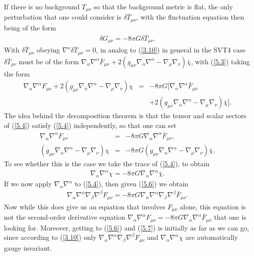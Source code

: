 If there is no background $T_{\mu\nu}$ so that the background metric is flat, the only perturbation that one could consider is $\delta \bar{T}_{\mu\nu}$, with the fluctuation equation then being of the form 
%
\begin{eqnarray}
\delta G_{\mu\nu}=-8 \pi G \delta \bar{T}_{\mu\nu}. 
\label{5.3}
\end{eqnarray}
%
With  $\delta \bar{T}_{\mu\nu}$ obeying $\nabla^{\nu}\delta \bar{T}_{\mu\nu}=0$, in analog to (\ref{3.10}) in general in the SVT4 case $\delta \bar{T}_{\mu\nu}$ must be of the form $\nabla_{\alpha}\nabla^{\alpha}\bar{F}_{\mu\nu}+2(g_{\mu\nu}\nabla_{\alpha}\nabla^{\alpha}-\nabla_{\mu}\nabla_{\nu})\bar{\chi}$, with (\ref{5.3}) taking the form 
%
\begin{eqnarray}
\nabla_{\alpha}\nabla^{\alpha}F_{\mu\nu}+2(g_{\mu\nu}\nabla_{\alpha}\nabla^{\alpha}-\nabla_{\mu}\nabla_{\nu})\chi&=&-8 \pi G[\nabla_{\alpha}\nabla^{\alpha}\bar{F}_{\mu\nu}
\\
&&+2(g_{\mu\nu}\nabla_{\alpha}\nabla^{\alpha}-\nabla_{\mu}\nabla_{\nu})\bar{\chi}]. 
\nonumber
\label{5.4}
\end{eqnarray}
%
The idea behind the decomposition theorem is that the tensor and scalar sectors of (\ref{5.4}) satisfy (\ref{5.4}) independently, so that one can set 
%
\begin{eqnarray}
\nabla_{\alpha}\nabla^{\alpha}F_{\mu\nu}&=&-8 \pi G\nabla_{\alpha}\nabla^{\alpha}\bar{F}_{\mu\nu},
\nonumber\\
(g_{\mu\nu}\nabla_{\alpha}\nabla^{\alpha}-\nabla_{\mu}\nabla_{\nu})\chi&=&-8 \pi G(g_{\mu\nu}\nabla_{\alpha}\nabla^{\alpha}-\nabla_{\mu}\nabla_{\nu})\bar{\chi}. 
\label{5.5}
\end{eqnarray}
%
To see whether this is the case we take the trace of (\ref{5.4}), to obtain 
%
\begin{eqnarray}
\nabla_{\alpha}\nabla^{\alpha}\chi=-8 \pi G\nabla_{\alpha}\nabla^{\alpha}\bar{\chi}. 
\label{5.6}
\end{eqnarray}
%
If we now apply $\nabla_{\alpha}\nabla^{\alpha}$ to (\ref{5.4}), then given (\ref{5.6})  we obtain
%
\begin{eqnarray}
\nabla_{\alpha}\nabla^{\alpha}\nabla_{\beta}\nabla^{\beta}F_{\mu\nu}=-8\pi G \nabla_{\alpha}\nabla^{\alpha}\nabla_{\beta}\nabla^{\beta}\bar{F}_{\mu\nu}.
\label{5.7}
\end{eqnarray}
% 
Now while this does give us an equation that involves $F_{\mu\nu}$ alone, this equation is not the second-order derivative equation $\nabla_{\alpha}\nabla^{\alpha}F_{\mu\nu}=-8 \pi G\nabla_{\alpha}\nabla^{\alpha}\bar{F}_{\mu\nu}$ that one is looking for. Moreover, getting to (\ref{5.6}) and (\ref{5.7}) is initially as far as we can go, since according to  (\ref{3.10}) only $\nabla_{\alpha}\nabla^{\alpha}\nabla_{\beta}\nabla^{\beta}F_{\mu\nu}$ and $\nabla_{\alpha}\nabla^{\alpha}\chi$ are automatically gauge invariant.


